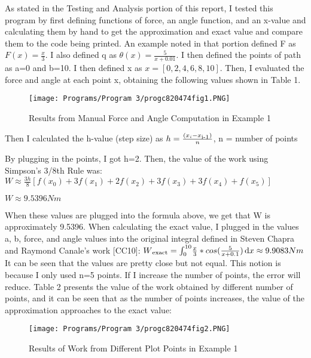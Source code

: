 \documentclass{article}
\begin{document}
{\color{black}
 As stated in the Testing and Analysis portion of this report, I tested this program by first defining functions of force, an angle function, and an x-value and calculating them by hand to get the approximation and exact value and compare them to the code being printed.  An example noted in that portion defined F as $F(x)=\frac{x}{3}$.  I also defined q as $\theta(x)=\frac{5}{x+0.01}$.  I then defined the points of path as a=0 and b=10.  I  then defined x as $x=[0,2,4,6,8,10]$.  Then, I evaluated the force and angle at each point x, obtaining the following values shown in Table 1.
 \par \medskip
 \begin{figure}[!ht]
\centering  %
\texttt{[image: Programs/Program 3/progc820474fig1.PNG]}
 \caption{Results from Manual Force and Angle Computation in Example 1}
 \label{f:Table 1}
\end{figure}
\par \medskip
Then I calculated the h-value (step size) as 
$h=\frac{(x_i-x\textsubscript{i-1})}{n}$, n = number of points
\par \medskip
      By plugging in the points, I got h=2.  Then, the value of the work using Simpson’s 3/8th Rule was:
$W \approx \frac{3h}{8} [f(x_0 )+3f(x_1 )+2f(x_2 )+3f(x_3 )+3f(x_4 )+f(x_5 )]$
\par \medskip
$W \approx 9.5396 Nm$
\par \medskip
When these values are plugged into the formula above, we get that W is approximately 9.5396.  When calculating the exact value, I plugged in the values a, b, force, and angle values into the original integral defined in Steven Chapra and Raymond Canale’s work [CC10]: 
$W\textsubscript{exact}=\int_{0}^{10}\! \frac{x}{3}*cos(\frac{5}{x+0.1}) \, \mathrm{d}x \approx 9.9083 Nm$
It can be seen that the values are pretty close but not equal. This notion is because I only used n=5 points. If I increase the number of points, the error will reduce. Table 2 presents the value of the work obtained by different number of points, and it can be seen that as the number of points increases, the value of the approximation approaches to the exact value:
\par \medskip
 \begin{figure}[!ht]
\centering  %
\texttt{[image: Programs/Program 3/progc820474fig2.PNG]}
 \caption{Results of Work from Different Plot Points in Example 1}
 \label{f:Table 2}
\end{figure}
}
\end{document}
